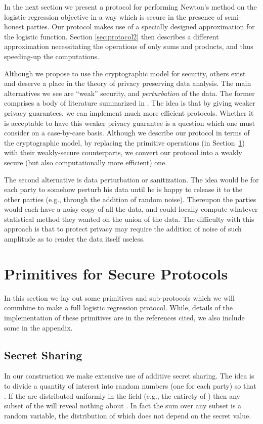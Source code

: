 \documentclass[11pt]{article}
\begin{document}
In the next section we present a protocol for performing Newton's method on the logistic regression objective in a way which is secure in the presence of semi-honest parties. Our protocol makes use of a specially designed approximation for the logistic function. Section \ref{sec:protocol2} then describes a different approximation necessitating  the operations of only sums and products, and thus speeding-up the computations.

Although we propose to use the cryptographic model for security, others exist and deserve a place in the theory of privacy preserving data analysis.  The main alternatives we see are ``weak'' security, and {\em perturbation} of the data.  The former comprises a body of literature summarized in \citet{ppdm_book}.  The idea is that by giving weaker privacy guarantees, we can implement much more efficient protocols.  Whether it is acceptable to have this weaker privacy guarantee is a question which one must   consider  on a case-by-case basis.  Although we describe our protocol in terms of the cryptographic model, by replacing the primitive operations (in Section~\ref{sec:blocks}) with their weakly-secure counterparts, we convert our protocol into a weakly secure (but also computationally more efficient) one.

The second alternative is data perturbation or sanitization.  The idea would be for each party to somehow perturb his data until he is happy to release it to the other parties (e.g., through the addition of random noise).  Thereupon the parties would each have a noisy copy of all the data, and could locally compute whatever statistical method they wanted on the union of the data.  The difficulty with this approach is that to protect privacy may require the addition of noise of such amplitude as to render the data itself useless.


\section{Primitives for Secure Protocols}\label{sec:blocks}

In this section we lay out some primitives and  sub-protocols which we will commbine to make a full logistic regression protocol.  While, details of the implementation of these primitives are  in the references cited, we also include some  in the appendix.

\subsection{Secret Sharing}
In our construction we  make extensive use of additive secret sharing.  The idea is to divide a quantity of interest  into  random numbers  (one for each party) so that .  If the  are distributed uniformly in the field (e.g., the entirety of ) then any subset of the  will reveal nothing about .  In fact the sum over any subset is a random variable, the distribution of which does not depend on the secret value.
\end{document}
